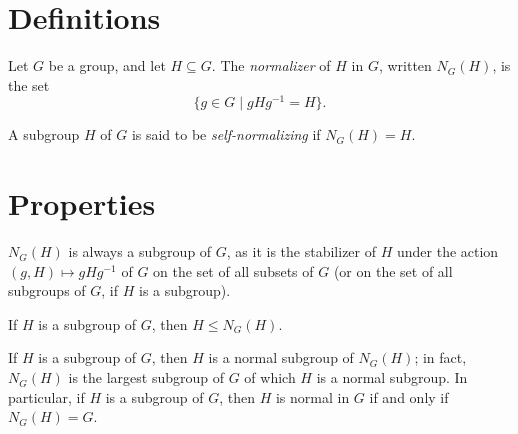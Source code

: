 \documentclass[12pt]{article}
\begin{document}
\section*{Definitions}

Let $G$ be a group, and let $H \subseteq G$.
The {\em normalizer} of $H$ in $G$, written $N_G(H)$, is the set
\[
  \{ g \in G \mid gHg^{-1}=H \}.
\]

A subgroup $H$ of $G$ is said to be {\em self-normalizing} if $N_G(H) = H$.

\section*{Properties}

$N_G(H)$ is always a subgroup of $G$,
as it is the stabilizer of $H$ under the action $(g,H)\mapsto gHg^{-1}$
of $G$ on the set of all subsets of $G$
(or on the set of all subgroups of $G$, if $H$ is a subgroup).

If $H$ is a subgroup of $G$, then $H\leq N_G(H)$.

If $H$ is a subgroup of $G$, then $H$ is a normal subgroup of $N_G(H)$;
in fact, $N_G(H)$ is the largest subgroup of $G$
of which $H$ is a normal subgroup.
In particular, if $H$ is a subgroup of $G$,
then $H$ is normal in $G$ if and only if $N_G(H)=G$.
\end{document}
